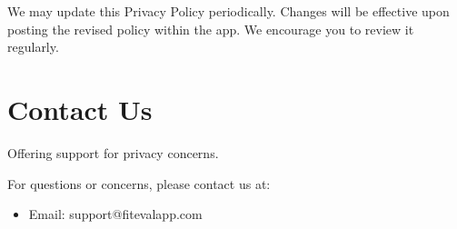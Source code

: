 \documentclass[a4paper,12pt]{article}
\begin{document}
We may update this Privacy Policy periodically. Changes will be effective upon posting the revised policy within the app. We encourage you to review it regularly.

\section*{Contact Us}
Offering support for privacy concerns.

For questions or concerns, please contact us at:
\begin{itemize}
    \item Email: support@fitevalapp.com
\end{itemize}
\end{document}
